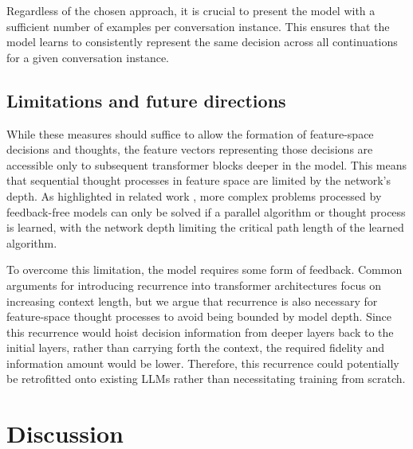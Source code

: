 \documentclass{article}
\begin{document}
Regardless of the chosen approach, it is crucial to present the model with a sufficient number of examples per conversation instance. This ensures that the model learns to consistently represent the same decision across all continuations for a given conversation instance.

\subsection{Limitations and future directions}
\label{sec:limitations}
While these measures should suffice to allow the formation of feature-space decisions and thoughts, the feature vectors representing those decisions are accessible only to subsequent transformer blocks deeper in the model. This means that sequential thought processes in feature space are limited by the network's depth. As highlighted in related work \cite{goyal2024think}, more complex problems processed by feedback-free models can only be solved if a parallel algorithm or thought process is learned, with the network depth limiting the critical path length of the learned algorithm.

To overcome this limitation, the model requires some form of feedback. Common arguments for introducing recurrence into transformer architectures focus on increasing context length, but we argue that recurrence is also necessary for feature-space thought processes to avoid being bounded by model depth. Since this recurrence would hoist decision information from deeper layers back to the initial layers, rather than carrying forth the context, the required fidelity and information amount would be lower. Therefore, this recurrence could potentially be retrofitted onto existing LLMs rather than necessitating training from scratch.


\section{Discussion}

\end{document}
